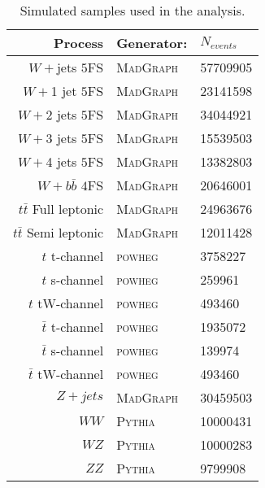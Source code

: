 \begin{table}[htb]
\begin{center}
\begin{tabular}{|r|l|l|}
\hline
\textbf{Process}&\textbf{Generator:}& $N_{events}$ \\ 
\hline
$W + $jets $5$FS   & \textsc{MadGraph}  & 57709905 \\ 
$W + $1 jet $5$FS  & \textsc{MadGraph}  & 23141598 \\
$W + $2 jets $5$FS & \textsc{MadGraph}  & 34044921 \\
$W + $3 jets $5$FS & \textsc{MadGraph}  & 15539503 \\
$W + $4 jets $5$FS & \textsc{MadGraph}  & 13382803 \\
$W+b\bar{b}$ $4$FS & \textsc{MadGraph}  & 20646001 \\
\hline
$t\bar{t}$ Full leptonic & \textsc{MadGraph}  & 24963676 \\
$t\bar{t}$ Semi leptonic        & \textsc{MadGraph}  & 12011428 \\
$t$ t-channel      & \textsc{powheg}    & 3758227  \\ 
$t$ s-channel      & \textsc{powheg}    & 259961   \\
$t$ tW-channel     & \textsc{powheg}    & 493460   \\
$\bar{t}$ t-channel  & \textsc{powheg}  & 1935072  \\
$\bar{t}$ s-channel  & \textsc{powheg}  & 139974   \\
$\bar{t}$ tW-channel & \textsc{powheg}  & 493460   \\
\hline
$Z + jets  $ & \textsc{MadGraph}        & 30459503 \\
$WW     $    & \textsc{Pythia}          & 10000431 \\
$WZ     $    & \textsc{Pythia}          & 10000283 \\
$ZZ     $    & \textsc{Pythia}          & 9799908  \\
\hline
\end{tabular}
\end{center}
\caption{Simulated samples used in the analysis.} 
\label{tab:mcsamples}
\end{table}


